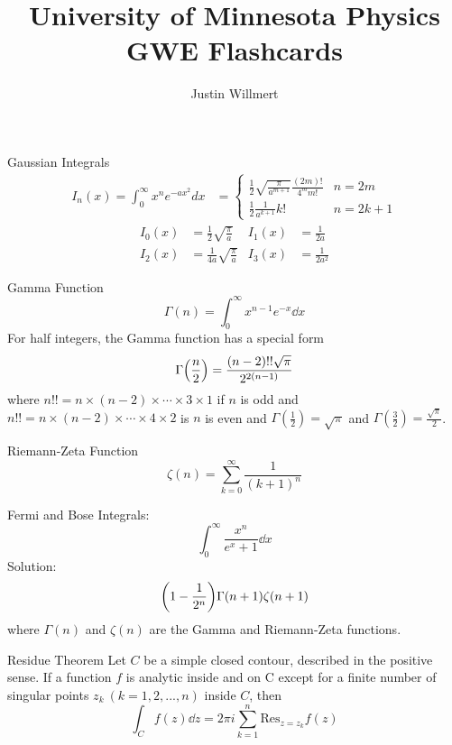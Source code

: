 \documentclass[avery5371,grid]{flashcards}
\title{University of Minnesota Physics GWE Flashcards}
\author{Justin Willmert}
\begin{document}

\begin{flashcard}[Formula]{Gaussian Integrals}
	\begin{align*}
		I_n(x) = \!\! \int_0^{\infty}  \!\! x^n e^{-ax^2} dx &=
			\begin{cases}
				\displaystyle
				\frac{1}{2} \sqrt{\frac{{\pi}}{a^{m+1}}} \frac{(2m)!}{4^m m!}
					& \text{$n = 2m$} \\
				\displaystyle
				\frac{1}{2} \frac{1}{a^{k+1}} k!
					& \text{$n = 2k + 1$}
			\end{cases}
	\end{align*}
	\vspace{-\baselineskip}
	\begin{align*}
		I_0(x) &= \frac 12 \sqrt{\frac{\pi}{a}}
			& I_1(x) &= \frac {1}{2a} \\
		I_2(x) &= \frac{1}{4a} \sqrt{\frac{\pi}{a}}
			& I_3(x) &= \frac {1}{2a^2}
	\end{align*}
\end{flashcard}

\begin{flashcard}[Definition]{Gamma Function}
	$$\Gamma(n) = \int_0^\infty x^{n-1}e^{-x}\dd x$$ 
	For half integers, the Gamma function has a special form
	$$\Gamma\qty(\frac{n}{2}) = \frac{(n-2)!!\sqrt{\pi}}{2^{2(n-1)}}$$ 
	where $n!! = n\times(n-2)\times\cdots\times3\times 1$ if $n$ is odd and $n!! =n\times(n-2)\times\cdots\times4\times2$ is $n$ is even and $\Gamma(\frac{1}{2}) =\sqrt{\pi}$ and $\Gamma(\frac{3}{2}) = \frac{\sqrt{\pi}}{2}$.
\end{flashcard}

\begin{flashcard}[Definition]{Riemann-Zeta Function}
	$$\zeta(n) = \sum_{k=0}^{\infty}\frac{1}{(k+1)^n}$$
\end{flashcard}

\begin{flashcard}[Definition]{Fermi and Bose Integrals: $$\int_0^\infty \frac{x^n}{e^x+1}\dd x$$ }
	Solution: $$\qty(1-\frac{1}{2^n})\Gamma(n+1)\zeta(n+1)$$
	where $\Gamma(n)$ and $\zeta(n)$ are the Gamma and Riemann-Zeta functions.
\end{flashcard}

\begin{flashcard}[Theory]{Residue Theorem}
	Let $C$ be a simple closed contour, described in the positive sense. If a function $f$ is analytic inside and on C except for a finite number of singular points $z_k\ (k = 1, 2, . . . , n)$ inside $C$, then
	\begin{equation*}
		\int_{C}f(z)\dd z = 2\pi i \sum_{k=1}^n\text{Res}_{z=z_k}f(z)
	\end{equation*}
\end{flashcard}
\end{document}
